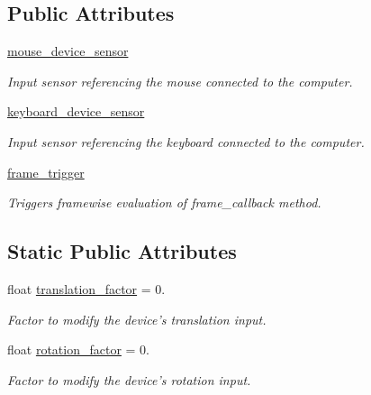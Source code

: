 \subsection*{\-Public \-Attributes}
\begin{DoxyCompactItemize}
\item 
\hyperlink{classlib_1_1Device_1_1KeyboardMouseDevice_a478dc1dd539a8eab8a819675df4a1cf0}{mouse\-\_\-device\-\_\-sensor}
\begin{DoxyCompactList}\small\item\em \-Input sensor referencing the mouse connected to the computer. \end{DoxyCompactList}\item 
\hyperlink{classlib_1_1Device_1_1KeyboardMouseDevice_a4bc759500a1e3c0c8f597ab76de2fab8}{keyboard\-\_\-device\-\_\-sensor}
\begin{DoxyCompactList}\small\item\em \-Input sensor referencing the keyboard connected to the computer. \end{DoxyCompactList}\item 
\hyperlink{classlib_1_1Device_1_1KeyboardMouseDevice_aebc4f3bcb8f58c71902ead20eade30b7}{frame\-\_\-trigger}
\begin{DoxyCompactList}\small\item\em \-Triggers framewise evaluation of frame\-\_\-callback method. \end{DoxyCompactList}\end{DoxyCompactItemize}
\subsection*{\-Static \-Public \-Attributes}
\begin{DoxyCompactItemize}
\item 
float \hyperlink{classlib_1_1Device_1_1KeyboardMouseDevice_aaf8a0ccdb6ab57e3e7b6710b137af971}{translation\-\_\-factor} = 0.
\begin{DoxyCompactList}\small\item\em \-Factor to modify the device's translation input. \end{DoxyCompactList}\item 
float \hyperlink{classlib_1_1Device_1_1KeyboardMouseDevice_a1587b95d293ad632c16f7e065f879f12}{rotation\-\_\-factor} = 0.
\begin{DoxyCompactList}\small\item\em \-Factor to modify the device's rotation input. \end{DoxyCompactList}\end{DoxyCompactItemize}



